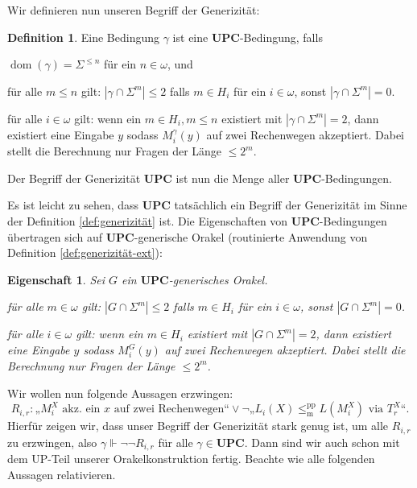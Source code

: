 \documentclass[nofonts]{uebung}
\newtheorem{property}[theorem]{Eigenschaft}
\theoremstyle{definition}
\newtheorem{definition}[theorem]{Definition}
\DeclareMathOperator{\dom}{dom}
\def\leqmpp{\ensuremath{\leq_\mathrm{m}^\mathrm{pp}}}
\begin{document}
Wir definieren nun unseren Begriff der Generizität:
\begin{definition}\label{def:upc}
    Eine Bedingung $\gamma$ ist eine $\mathbf{UPC}$-Bedingung, falls
    \begin{thmenum}
        \item $\dom(\gamma)=\Sigma^{\leq n}$ für ein $n\in\omega$, und
        \item\label{def:upc-sparsity} für alle $m\leq n$ gilt: $|\gamma\cap\Sigma^m|\leq 2$ falls $m\in H_i$ für ein $i\in\omega$, sonst $|\gamma\cap\Sigma^m|=0$.
        \item\label{def:upc-generizität-zeugensprache} für alle $i\in\omega$ gilt: wenn ein $m\in H_i,m\leq n$ existiert mit $|\gamma\cap\Sigma^m|=2$, dann existiert eine Eingabe $y$ sodass $M_i^\gamma(y)$ auf zwei Rechenwegen akzeptiert. Dabei stellt die Berechnung nur Fragen der Länge $\leq 2^m$.
    \end{thmenum}
    Der Begriff der Generizität $\mathbf{UPC}$ ist nun die Menge aller $\mathbf{UPC}$-Bedingungen.
\end{definition}
Es ist leicht zu sehen, dass $\mathbf{UPC}$ tatsächlich ein Begriff der Generizität im Sinne der Definition \ref{def:generizität} ist.
Die Eigenschaften von $\mathbf{UPC}$-Bedingungen übertragen sich auf $\mathbf{UPC}$-generische Orakel (routinierte Anwendung von Definition \ref{def:generizität-ext}):
\begin{property}\label{prop:upc-orakel}
    Sei $G$ ein $\mathbf{UPC}$-generisches Orakel.
    \begin{thmenum}[start=2]
        \item\label{def:upc-orakel-sparsity} für alle $m\in\omega$ gilt: $|G\cap\Sigma^m|\leq 2$ falls $m\in H_i$ für ein $i\in\omega$, sonst $|G\cap\Sigma^m|=0$.
        \item\label{def:upc-orakel-generizität-zeugensprache} für alle $i\in\omega$ gilt: wenn ein $m\in H_i$ existiert mit $|G\cap\Sigma^m|=2$, dann existiert eine Eingabe $y$ sodass $M_i^G(y)$ auf zwei Rechenwegen akzeptiert. Dabei stellt die Berechnung nur Fragen der Länge $\leq 2^m$.
    \end{thmenum}
\end{property}

Wir wollen nun folgende Aussagen erzwingen:
\[ R_{i,r}\colon \text{„$M_i^X$ akz. ein $x$ auf zwei Rechenwegen“} \lor \neg„L_{i}(X)\leqmpp L(M_i^X)\text{ via }T^X_r“. \]
Hierfür zeigen wir, dass unser Begriff der Generizität stark genug ist, um alle $R_{i,r}$ zu erzwingen, also $\gamma\Vdash\neg\neg R_{i,r}$ für alle $\gamma\in\mathbf{UPC}$.
Dann sind wir auch schon mit dem UP-Teil unserer Orakelkonstruktion fertig.
Beachte wie alle folgenden Aussagen relativieren.
\end{document}

